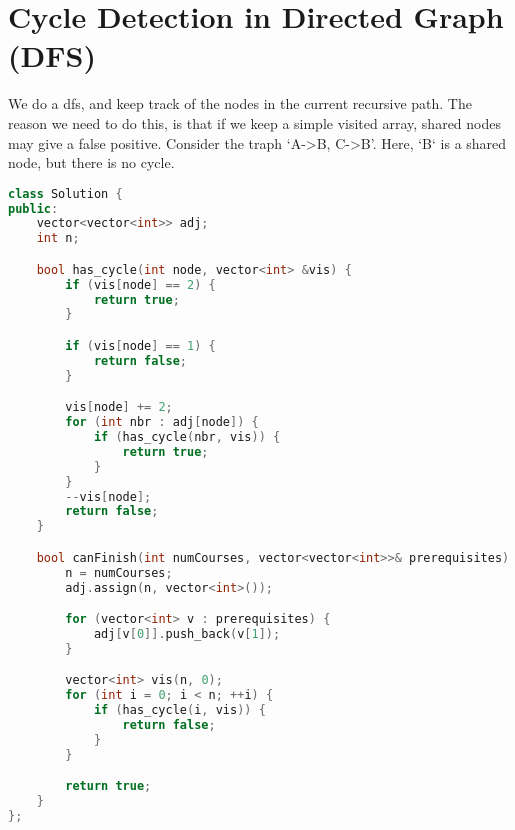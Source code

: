 \documentclass[12pt]{article}
\begin{document}
\section{Cycle Detection in Directed Graph (DFS)}
We do a dfs, and keep track of the nodes in the current recursive path. The reason we need to do this, is that if we keep a simple visited array, shared nodes may give a false positive. Consider the traph `A->B, C->B'. Here, `B` is a shared node, but there is no cycle.

\begin{lstlisting}[language=C++]
class Solution {
public:
    vector<vector<int>> adj;
    int n;

    bool has_cycle(int node, vector<int> &vis) {
        if (vis[node] == 2) {
            return true;
        }

        if (vis[node] == 1) {
            return false;
        }

        vis[node] += 2;
        for (int nbr : adj[node]) {
            if (has_cycle(nbr, vis)) {
                return true;
            }
        }
        --vis[node];
        return false;
    }

    bool canFinish(int numCourses, vector<vector<int>>& prerequisites) {
        n = numCourses;
        adj.assign(n, vector<int>());

        for (vector<int> v : prerequisites) {
            adj[v[0]].push_back(v[1]);
        }

        vector<int> vis(n, 0);
        for (int i = 0; i < n; ++i) {
            if (has_cycle(i, vis)) {
                return false;
            }
        }

        return true;
    }
};
\end{lstlisting}
\end{document}
